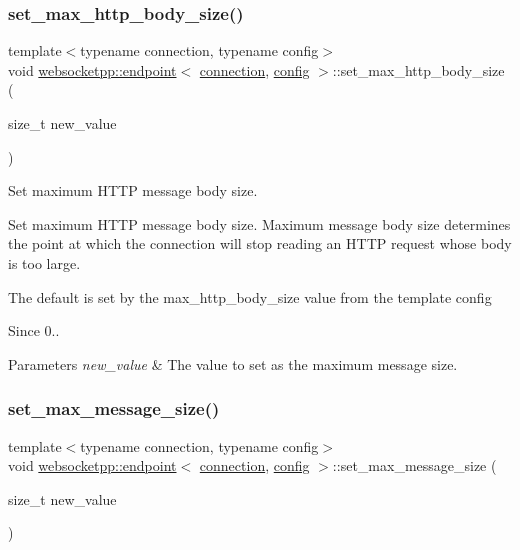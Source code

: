 \subsubsection{\texorpdfstring{set\+\_\+max\+\_\+http\+\_\+body\+\_\+size()}{set\_max\_http\_body\_size()}}
{\footnotesize\ttfamily template$<$typename connection, typename config$>$ \\
void \mbox{\hyperlink{classwebsocketpp_1_1endpoint}{websocketpp\+::endpoint}}$<$ \mbox{\hyperlink{classwebsocketpp_1_1connection}{connection}}, \mbox{\hyperlink{classconfig}{config}} $>$\+::set\+\_\+max\+\_\+http\+\_\+body\+\_\+size (\begin{DoxyParamCaption}\item[{size\+\_\+t}]{new\+\_\+value }\end{DoxyParamCaption})\hspace{0.3cm}{\ttfamily [inline]}}



Set maximum H\+T\+TP message body size. 

Set maximum H\+T\+TP message body size. Maximum message body size determines the point at which the connection will stop reading an H\+T\+TP request whose body is too large.

The default is set by the max\+\_\+http\+\_\+body\+\_\+size value from the template config

\begin{DoxySince}{Since}
0..
\end{DoxySince}

\begin{DoxyParams}{Parameters}
{\em new\+\_\+value} & The value to set as the maximum message size. \\
\hline
\end{DoxyParams}
\mbox{\label{classwebsocketpp_1_1endpoint_a6268a63c9ce030941fcfb32ddabf3090}} 
\subsubsection{\texorpdfstring{set\+\_\+max\+\_\+message\+\_\+size()}{set\_max\_message\_size()}}
{\footnotesize\ttfamily template$<$typename connection, typename config$>$ \\
void \mbox{\hyperlink{classwebsocketpp_1_1endpoint}{websocketpp\+::endpoint}}$<$ \mbox{\hyperlink{classwebsocketpp_1_1connection}{connection}}, \mbox{\hyperlink{classconfig}{config}} $>$\+::set\+\_\+max\+\_\+message\+\_\+size (\begin{DoxyParamCaption}\item[{size\+\_\+t}]{new\+\_\+value }\end{DoxyParamCaption})\hspace{0.3cm}{\ttfamily [inline]}}



